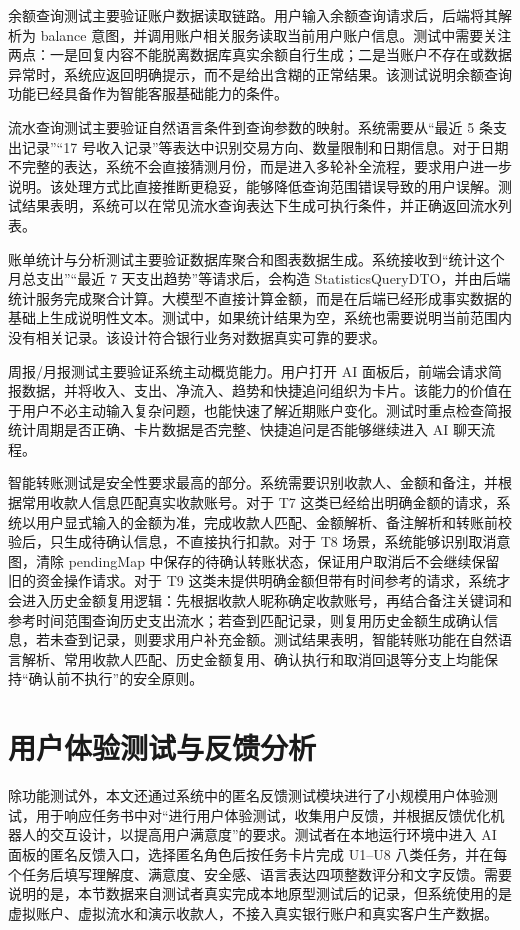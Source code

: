 \documentclass[bachelor, print]{xduthesis}
\begin{document}
余额查询测试主要验证账户数据读取链路。用户输入余额查询请求后，后端将其解析为 balance 意图，并调用账户相关服务读取当前用户账户信息。测试中需要关注两点：一是回复内容不能脱离数据库真实余额自行生成；二是当账户不存在或数据异常时，系统应返回明确提示，而不是给出含糊的正常结果。该测试说明余额查询功能已经具备作为智能客服基础能力的条件。

流水查询测试主要验证自然语言条件到查询参数的映射。系统需要从“最近 5 条支出记录”“17 号收入记录”等表达中识别交易方向、数量限制和日期信息。对于日期不完整的表达，系统不会直接猜测月份，而是进入多轮补全流程，要求用户进一步说明。该处理方式比直接推断更稳妥，能够降低查询范围错误导致的用户误解。测试结果表明，系统可以在常见流水查询表达下生成可执行条件，并正确返回流水列表。

账单统计与分析测试主要验证数据库聚合和图表数据生成。系统接收到“统计这个月总支出”“最近 7 天支出趋势”等请求后，会构造 StatisticsQueryDTO，并由后端统计服务完成聚合计算。大模型不直接计算金额，而是在后端已经形成事实数据的基础上生成说明性文本。测试中，如果统计结果为空，系统也需要说明当前范围内没有相关记录。该设计符合银行业务对数据真实可靠的要求。

周报/月报测试主要验证系统主动概览能力。用户打开 AI 面板后，前端会请求简报数据，并将收入、支出、净流入、趋势和快捷追问组织为卡片。该能力的价值在于用户不必主动输入复杂问题，也能快速了解近期账户变化。测试时重点检查简报统计周期是否正确、卡片数据是否完整、快捷追问是否能够继续进入 AI 聊天流程。

智能转账测试是安全性要求最高的部分。系统需要识别收款人、金额和备注，并根据常用收款人信息匹配真实收款账号。对于 T7 这类已经给出明确金额的请求，系统以用户显式输入的金额为准，完成收款人匹配、金额解析、备注解析和转账前校验后，只生成待确认信息，不直接执行扣款。对于 T8 场景，系统能够识别取消意图，清除 pendingMap 中保存的待确认转账状态，保证用户取消后不会继续保留旧的资金操作请求。对于 T9 这类未提供明确金额但带有时间参考的请求，系统才会进入历史金额复用逻辑：先根据收款人昵称确定收款账号，再结合备注关键词和参考时间范围查询历史支出流水；若查到匹配记录，则复用历史金额生成确认信息，若未查到记录，则要求用户补充金额。测试结果表明，智能转账功能在自然语言解析、常用收款人匹配、历史金额复用、确认执行和取消回退等分支上均能保持“确认前不执行”的安全原则。

\section{用户体验测试与反馈分析}

除功能测试外，本文还通过系统中的匿名反馈测试模块进行了小规模用户体验测试，用于响应任务书中对“进行用户体验测试，收集用户反馈，并根据反馈优化机器人的交互设计，以提高用户满意度”的要求。测试者在本地运行环境中进入 AI 面板的匿名反馈入口，选择匿名角色后按任务卡片完成 U1--U8 八类任务，并在每个任务后填写理解度、满意度、安全感、语言表达四项整数评分和文字反馈。需要说明的是，本节数据来自测试者真实完成本地原型测试后的记录，但系统使用的是虚拟账户、虚拟流水和演示收款人，不接入真实银行账户和真实客户生产数据。
\end{document}
